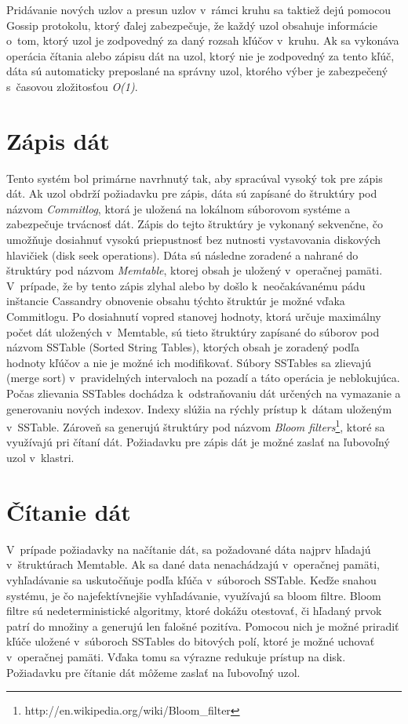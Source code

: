 \documentclass[11pt,twoside,a4paper]{book}
\begin{document}
Pridávanie nových uzlov a presun uzlov v~rámci kruhu sa taktiež dejú pomocou Gossip protokolu, ktorý ďalej zabezpečuje, že každý uzol obsahuje informácie o~tom, ktorý uzol je zodpovedný za daný rozsah kľúčov v~kruhu. Ak sa vykonáva operácia čítania alebo zápisu dát na uzol, ktorý nie je zodpovedný za tento kľúč, dáta sú automaticky preposlané na správny uzol, ktorého výber je zabezpečený s~časovou zložitosťou \textit{O(1)}.


\section{Zápis dát}
Tento systém bol primárne navrhnutý tak, aby spracúval vysoký tok pre zápis dát. Ak uzol obdrží požiadavku pre zápis, dáta sú zapísané do štruktúry pod názvom \emph{Commitlog}, ktorá je uložená na lokálnom súborovom systéme a zabezpečuje trvácnosť dát. Zápis do tejto štruktúry je vykonaný sekvenčne, čo umožňuje dosiahnuť vysokú priepustnosť bez nutnosti vystavovania diskových hlavičiek (disk seek operations). Dáta sú následne zoradené a nahrané do štruktúry pod názvom \emph{Memtable}, ktorej obsah je uložený v~operačnej pamäti. V~prípade, že by tento zápis zlyhal alebo by došlo k~neočakávanému pádu inštancie Cassandry obnovenie obsahu týchto štruktúr je možné vďaka Commitlogu. Po dosiahnutí vopred stanovej hodnoty, ktorá určuje maximálny počet dát uložených v~Memtable, sú tieto štruktúry zapísané do súborov pod názvom SSTable (Sorted String Tables), ktorých obsah je zoradený podľa hodnoty kľúčov a nie je možné ich modifikovať. Súbory SSTables sa zlievajú (merge sort) v~pravidelných intervaloch na pozadí a táto operácia je neblokujúca. Počas zlievania SSTables dochádza k~odstraňovaniu dát určených na vymazanie a generovaniu nových indexov. Indexy slúžia na rýchly prístup k~dátam uloženým v~SSTable. Zároveň sa generujú štruktúry pod názvom \emph{Bloom filters}\footnote{http://en.wikipedia.org/wiki/Bloom\_filter}, ktoré sa využívajú pri čítaní dát. Požiadavku pre zápis dát je možné zaslať na ľubovoľný uzol v~klastri.


\section{Čítanie dát}
V~prípade požiadavky na načítanie dát, sa požadované dáta najprv hľadajú v~štruktúrach Memtable. Ak sa dané data nenachádzajú v~operačnej pamäti, vyhľadávanie sa uskutočňuje podľa kľúča v~súboroch SSTable. Keďže snahou systému, je čo najefektívnejšie vyhľadávanie, využívajú sa bloom filtre. Bloom filtre sú nedeterministické algoritmy, ktoré dokážu otestovať, či hľadaný prvok patrí do množiny a generujú len falošné pozitíva. Pomocou nich je možné priradiť kľúče uložené v~súboroch SSTables do bitových polí, ktoré je možné uchovať v~operačnej pamäti. Vďaka tomu sa výrazne redukuje prístup na disk. Požiadavku pre čítanie dát môžeme zaslať na ľubovoľný uzol.
\end{document}
